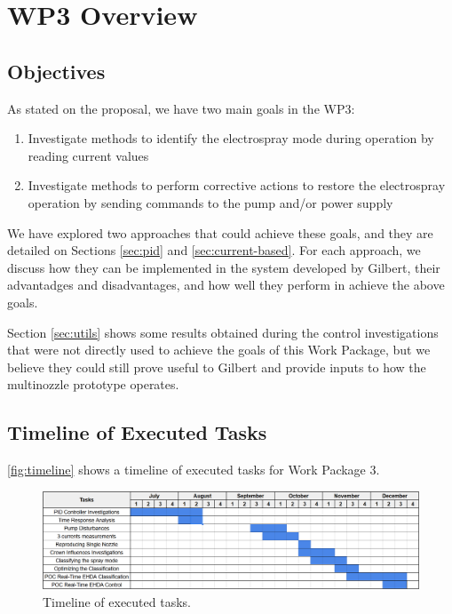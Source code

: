 \documentclass[oneside,12pt]{article}
\begin{document}
\setlength{\parindent}{0 em}  %
\setlength{\parskip}{0.7 em}    %

\newpage    \pagestyle{empty}
\tableofcontents
\pagestyle{fancy}
\newpage

\section{WP3 Overview}

\subsection{Objectives}

As stated on the proposal, we have two main goals in the WP3:

\begin{enumerate}
    \item Investigate methods to identify the electrospray mode during operation by reading current values
    \item Investigate methods to perform corrective actions to restore the electrospray operation by sending 
    commands to the pump and/or power supply
\end{enumerate}

We have explored two approaches that could achieve these goals, and they are detailed on Sections \ref{sec:pid} and 
\ref{sec:current-based}. For each approach, we discuss how they can be implemented in the system developed by Gilbert,
their advantadges and disadvantages, and how well they perform in achieve the above goals.

Section \ref{sec:utils} shows some results obtained during the control investigations that were not directly used to achieve
the goals of this Work Package, but we believe they could still prove useful to Gilbert and provide inputs to how the
multinozzle prototype operates.


\subsection{Timeline of Executed Tasks}

\autoref{fig:timeline} shows a timeline of executed tasks for Work Package 3.

\begin{figure}[h!]
    \centering
    \includegraphics[width=\textwidth,trim=1 1 1 1,clip]{figures/timeline.png}
    \caption{Timeline of executed tasks.}
    \label{fig:timeline}
\end{figure}
\end{document}
